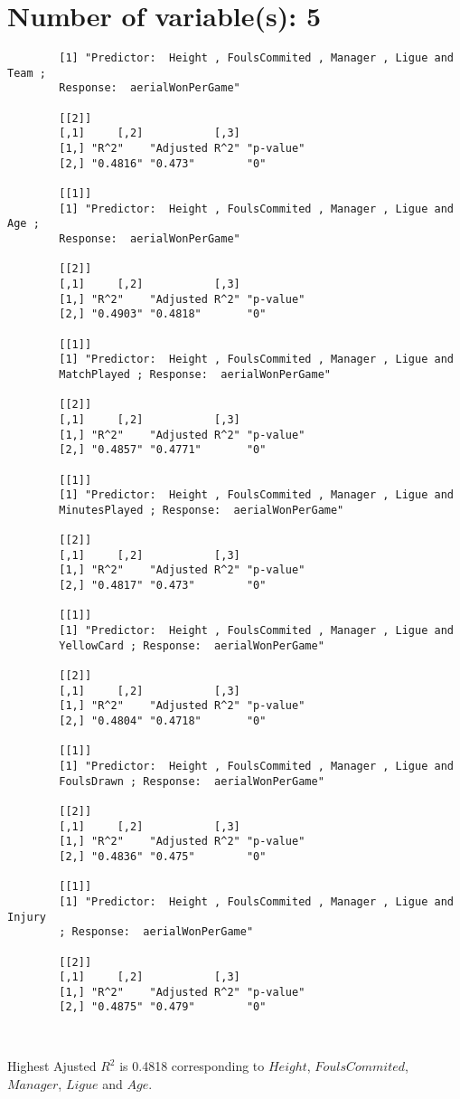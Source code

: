 \documentclass[12pt]{article}
\begin{document}
	\section{Number of variable(s): 5}
	\begin{verbatim}
		[1] "Predictor:  Height , FoulsCommited , Manager , Ligue and Team ; 
		Response:  aerialWonPerGame"
		
		[[2]]
		[,1]     [,2]           [,3]     
		[1,] "R^2"    "Adjusted R^2" "p-value"
		[2,] "0.4816" "0.473"        "0"      
		
		[[1]]
		[1] "Predictor:  Height , FoulsCommited , Manager , Ligue and Age ; 
		Response:  aerialWonPerGame"
		
		[[2]]
		[,1]     [,2]           [,3]     
		[1,] "R^2"    "Adjusted R^2" "p-value"
		[2,] "0.4903" "0.4818"       "0"      
		
		[[1]]
		[1] "Predictor:  Height , FoulsCommited , Manager , Ligue and 
		MatchPlayed ; Response:  aerialWonPerGame"
		
		[[2]]
		[,1]     [,2]           [,3]     
		[1,] "R^2"    "Adjusted R^2" "p-value"
		[2,] "0.4857" "0.4771"       "0"      
		
		[[1]]
		[1] "Predictor:  Height , FoulsCommited , Manager , Ligue and 
		MinutesPlayed ; Response:  aerialWonPerGame"
		
		[[2]]
		[,1]     [,2]           [,3]     
		[1,] "R^2"    "Adjusted R^2" "p-value"
		[2,] "0.4817" "0.473"        "0"      
		
		[[1]]
		[1] "Predictor:  Height , FoulsCommited , Manager , Ligue and 
		YellowCard ; Response:  aerialWonPerGame"
		
		[[2]]
		[,1]     [,2]           [,3]     
		[1,] "R^2"    "Adjusted R^2" "p-value"
		[2,] "0.4804" "0.4718"       "0"      
		
		[[1]]
		[1] "Predictor:  Height , FoulsCommited , Manager , Ligue and 
		FoulsDrawn ; Response:  aerialWonPerGame"
		
		[[2]]
		[,1]     [,2]           [,3]     
		[1,] "R^2"    "Adjusted R^2" "p-value"
		[2,] "0.4836" "0.475"        "0"      
		
		[[1]]
		[1] "Predictor:  Height , FoulsCommited , Manager , Ligue and Injury 
		; Response:  aerialWonPerGame"
		
		[[2]]
		[,1]     [,2]           [,3]     
		[1,] "R^2"    "Adjusted R^2" "p-value"
		[2,] "0.4875" "0.479"        "0"      
		
		
	\end{verbatim}
	Highest Ajusted $ R^2 $ is 0.4818 corresponding to $ Height $, $ FoulsCommited $, $ Manager $, $ Ligue $ and $ Age $.
	
\end{document}

